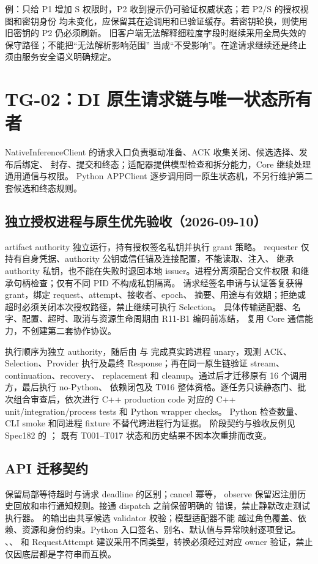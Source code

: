 例：只给 P1 增加 S 权限时，P2 收到提示仍可验证权威状态；若 P2/S 的授权视图和密钥身份
均未变化，应保留其在途调用和已验证缓存。若密钥轮换，则使用旧密钥的 P2 仍必须刷新。
旧客户端无法解释细粒度字段时继续采用全局失效的保守路径；不能把“无法解析影响范围”
当成“不受影响”。在途请求继续还是终止须由服务安全语义明确规定。

\section{TG-02：DI 原生请求链与唯一状态所有者}
NativeInferenceClient 的请求入口负责驱动准备、ACK 收集关闭、候选选择、发布后绑定、
封存、提交和终态；适配器提供模型检查和拆分能力，Core 继续处理通用通信与权限。
Python APPClient 逐步调用同一原生状态机，不另行维护第二套候选和终态规则。

\subsection{独立授权进程与原生优先验收（2026-09-10）}
artifact authority 独立运行，持有授权签名私钥并执行 grant 策略。
requester 仅持有自身凭据、authority 公钥或信任锚及连接配置，不能读取、注入、
继承 authority 私钥，也不能在失败时退回本地 issuer。进程分离须配合文件权限
和继承句柄检查；仅有不同 PID 不构成私钥隔离。
请求经签名申请与认证答复获得 grant，绑定 request、attempt、接收者、epoch、
摘要、用途与有效期；拒绝或超时必须关闭本次授权路径，禁止继续可执行 Selection。
具体传输适配器、名字、配置、超时、取消与资源生命周期由 R11-B1 编码前冻结，
复用 Core 通信能力，不创建第二套协作协议。

执行顺序为独立 authority，随后由  与
 完成真实跨进程 unary，观测 ACK、Selection、Provider
执行及最终 Response；再在同一原生链验证 stream、continuation、recovery、
replacement 和 cleanup。通过后才迁移原有 16 个调用方，最后执行 no-Python、
依赖闭包及 T016 整体资格。逐任务只读静态门、批次组合审查后，依次进行
C++ production code 对应的 C++ unit/integration/process tests 和 Python wrapper checks。
Python 检查数量、CLI smoke 和同进程 fixture 不替代跨进程行为证据。
阶段契约与验收反例见 Spec182 的 ；
既有 T001--T017 状态和历史结果不因本次重排而改变。

\subsection{API 迁移契约}
 保留局部等待超时与请求 deadline 的区别；cancel 幂等，
observe 保留迟注册历史回放和串行通知规则。接通 dispatch 之前保留明确的
 错误，禁止静默改走测试执行器。
 的输出由共享候选 validator 校验；模型适配器不能
越过角色覆盖、依赖、资源和身份约束。Python 入口签名、别名、默认值与异常映射逐项登记。
、、 和 RequestAttempt
建议采用不同类型，转换必须经过对应 owner 验证，禁止仅因底层都是字符串而互换。


